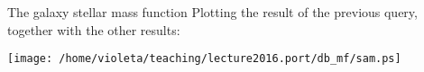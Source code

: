 \documentclass{beamer}
\newcommand{\eg}{\textsc{eagle}}
\begin{document}
\begin{frame}{The galaxy stellar mass function}
Plotting the result of the previous query, together with the other results:
\begin{center}
\texttt{[image: /home/violeta/teaching/lecture2016.port/db\_mf/sam.ps]}
\end{center}
\end{frame}


%
%
%
\end{document}
